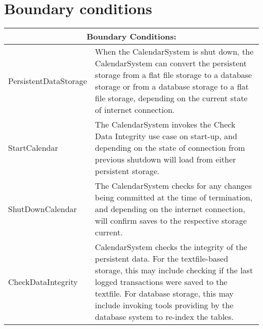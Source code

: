 \section{Boundary conditions}

\begin{tabular}{ |l|p{5cm}| }
  \hline
  \multicolumn{2}{|c|}{Boundary Conditions:} \\
  \hline
  PersistentDataStorage & When the CalendarSystem is shut down, the CalendarSystem can convert the persistent storage from a flat file storage to a database storage or from a database storage to a flat file storage, depending on the current state of internet connection.\\
  \hline
    StartCalendar & The CalendarSystem invokes the Check Data Integrity use case on start-up, and depending on the state of connection from previous shutdown will load from either persistent storage.\\
    \hline
    ShutDownCalendar & The CalendarSystem checks for any changes being committed at the time of termination, and depending on the internet connection, will confirm saves to the respective storage current. \\
    \hline
    CheckDataIntegrity & CalendarSystem checks the integrity of the persistent data. For the textfile-based storage, this may include checking if the last logged transactions were saved to the textfile. For database storage, this may include invoking tools providing by the database system to re-index the tables. \\
  \hline
\end{tabular}